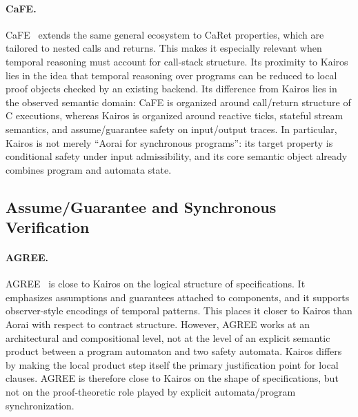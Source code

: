 \documentclass[11pt,a4paper]{article}
\begin{document}
\paragraph{CaFE.}
CaFE~\cite{cafe-page} extends the same general ecosystem to CaRet properties,
which are tailored to nested calls and returns. This makes it especially
relevant when temporal reasoning must account for call-stack structure. Its
proximity to Kairos lies in the idea that temporal reasoning over programs can
be reduced to local proof objects checked by an existing backend. Its
difference from Kairos lies in the observed semantic domain: CaFE is organized
around call/return structure of C executions, whereas Kairos is organized
around reactive ticks, stateful stream semantics, and assume/guarantee safety on
input/output traces. In particular, Kairos is not merely ``Aorai for
synchronous programs'': its target property is conditional safety under input
admissibility, and its core semantic object already combines program and
automata state.

\subsection{Assume/Guarantee and Synchronous Verification}

\paragraph{AGREE.}
AGREE~\cite{agree-techreport,agree-observers} is close to Kairos on the logical
structure of specifications. It emphasizes assumptions and guarantees attached
to components, and it supports observer-style encodings of temporal patterns.
This places it closer to Kairos than Aorai with respect to contract structure.
However, AGREE works at an architectural and compositional level, not at the
level of an explicit semantic product between a program automaton and two
safety automata. Kairos differs by making the local product step itself the
primary justification point for local clauses. AGREE is therefore close to
Kairos on the shape of specifications, but not on the proof-theoretic role
played by explicit automata/program synchronization.
\end{document}

